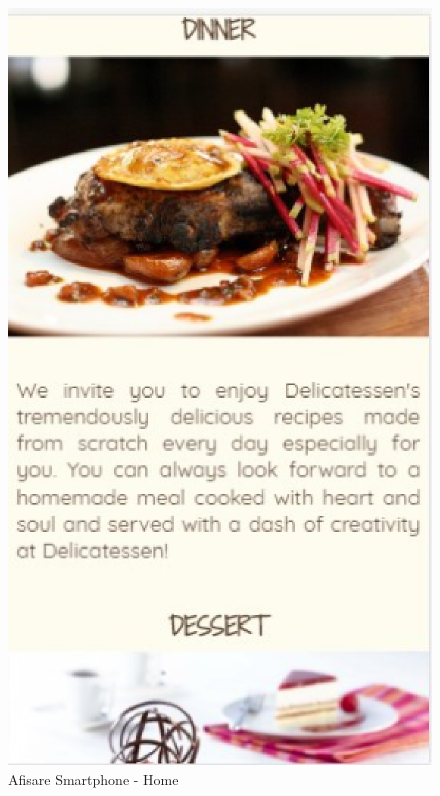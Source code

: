 \documentclass[11pt]{article}
\begin{document}
\begin{figure}[h]
\includegraphics{images/73.eps}
\caption{Afisare Smartphone - Home}
\end{figure}
\end{document}
